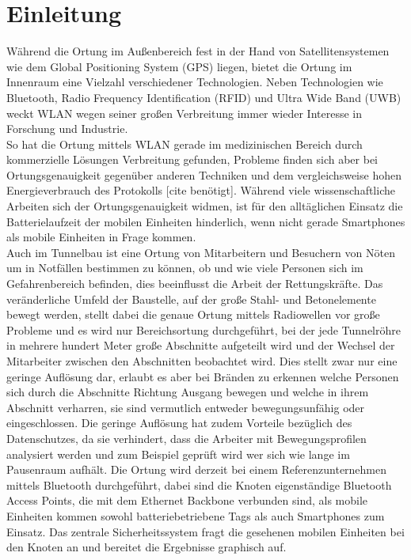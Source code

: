 
\chapter{Einleitung}
\label{ch:Einleitung}
Während die Ortung im Außenbereich fest in der Hand von Satellitensystemen wie dem Global Positioning System (GPS) liegen, bietet die Ortung im Innenraum eine Vielzahl verschiedener Technologien. Neben Technologien wie Bluetooth, Radio Frequency Identification (RFID) und Ultra Wide Band (UWB) weckt WLAN wegen seiner großen Verbreitung immer wieder Interesse in Forschung und Industrie. \\
So hat die Ortung mittels WLAN gerade im medizinischen Bereich durch kommerzielle Lösungen Verbreitung gefunden, Probleme finden sich aber bei Ortungsgenauigkeit gegenüber anderen Techniken \cite{liu2007survey} und dem vergleichsweise hohen Energieverbrauch des Protokolls [cite benötigt].
Während viele wissenschaftliche Arbeiten sich der Ortungsgenauigkeit widmen, ist für den alltäglichen Einsatz die Batterielaufzeit der mobilen Einheiten hinderlich, wenn nicht gerade Smartphones als mobile Einheiten in Frage kommen. \\
Auch im Tunnelbau ist eine Ortung von Mitarbeitern und Besuchern von Nöten um in Notfällen bestimmen zu können, ob und wie viele Personen sich im Gefahrenbereich befinden, dies beeinflusst die Arbeit der Rettungskräfte. 
Das veränderliche Umfeld der Baustelle, auf der große Stahl- und Betonelemente bewegt werden, stellt dabei die genaue Ortung mittels Radiowellen vor große Probleme und es wird nur Bereichsortung durchgeführt, bei der jede Tunnelröhre in mehrere hundert Meter große Abschnitte aufgeteilt wird und der Wechsel der Mitarbeiter zwischen den Abschnitten beobachtet wird. 
Dies stellt zwar nur eine geringe Auflösung dar, erlaubt es aber bei Bränden zu erkennen welche Personen sich durch die Abschnitte Richtung Ausgang bewegen und welche in ihrem Abschnitt verharren, sie sind vermutlich entweder bewegungsunfähig oder eingeschlossen. 
Die geringe Auflösung hat zudem Vorteile bezüglich des Datenschutzes, da sie verhindert, dass die Arbeiter mit Bewegungsprofilen analysiert werden und zum Beispiel geprüft wird wer sich wie lange im Pausenraum aufhält.
Die Ortung wird derzeit bei einem Referenzunternehmen mittels Bluetooth durchgeführt, dabei sind die Knoten eigenständige Bluetooth Access Points, die mit dem Ethernet Backbone verbunden sind, als mobile Einheiten kommen sowohl batteriebetriebene Tags als auch Smartphones zum Einsatz. 
Das zentrale Sicherheitssystem fragt die gesehenen mobilen Einheiten bei den Knoten an und bereitet die Ergebnisse graphisch auf.
 
